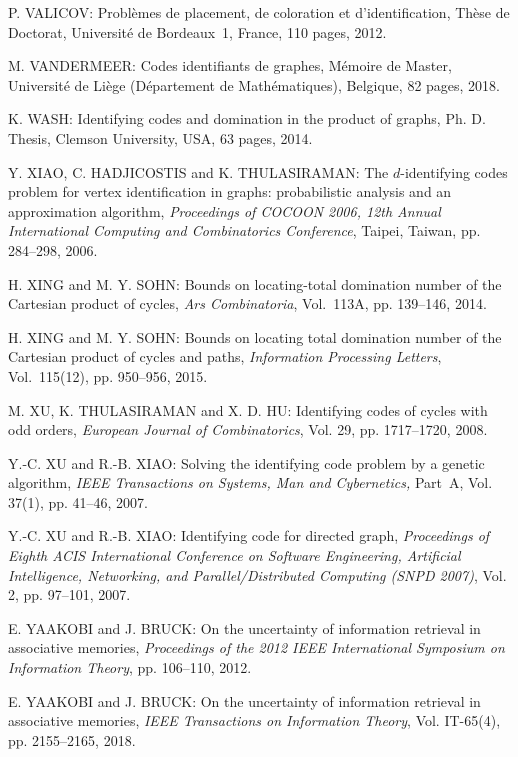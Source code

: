 \begin{thebibliography}{999}
P. VALICOV: Probl\`emes de placement, de coloration et d'identification, Th\`ese de Doctorat, Universit\'e de Bordeaux~1, France, 110 pages, 2012.

M. VANDERMEER: Codes identifiants de graphes, M\'emoire de Master, Universit\'e de Li\`ege (D\'epartement de Math\'e\-matiques), Belgique, 82 pages, 2018.

K. WASH: Identifying codes and domination in the product of graphs, Ph. D. Thesis, Clemson University, USA, 63 pages, 2014.

Y. XIAO, C. HADJICOSTIS and K. THULASIRAMAN: The $d$-identifying codes problem for vertex identification in graphs: probabilistic analysis and an approximation algorithm, {\it Proceedings of COCOON 2006, 12th Annual International Computing and Combinatorics Conference}, Taipei, Taiwan, pp. 284--298, 2006.

H. XING and M. Y. SOHN: Bounds on locating-total domination number of the Cartesian product of cycles, {\it Ars Combinatoria}, Vol.~113A, pp. 139--146, 2014. 

H. XING and M. Y. SOHN: Bounds on locating total domination number of the Cartesian product of cycles and paths, {\it Information Processing Letters}, Vol.~115(12), pp. 950--956, 2015.
  
M. XU, K. THULASIRAMAN and X. D. HU: Identifying codes of cycles with odd orders, {\it European Journal of Combinatorics}, Vol. 29, pp. 1717--1720, 2008.

Y.-C. XU and R.-B. XIAO: Solving the identifying code problem by a genetic algorithm, {\it IEEE Transactions on Systems, Man and Cybernetics,} Part~A, Vol. 37(1), pp. 41--46, 2007. 

Y.-C. XU and R.-B. XIAO: Identifying code for directed graph, {\it Proceedings of Eighth ACIS International Conference on Software Engineering, Artificial Intelligence, Networking, and Parallel/Distributed Computing (SNPD 2007)}, Vol. 2, pp. 97--101, 2007.

E. YAAKOBI and J. BRUCK: On the uncertainty of information retrieval in associative memories, {\it Proceedings of the 2012 IEEE International Symposium on Information Theory}, pp. 106--110, 2012.

E. YAAKOBI and J. BRUCK: On the uncertainty of information retrieval in associative memories, {\it IEEE Transactions on Information Theory}, Vol. IT-65(4), pp. 2155--2165, 2018.


\end{thebibliography}
